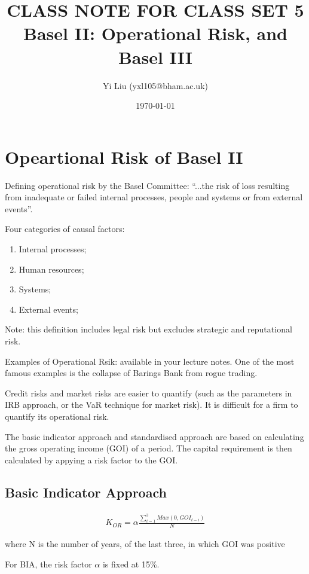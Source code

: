\documentclass[12pt]{article}
\author{Yi Liu (yxl105@bham.ac.uk)}
\date{\today}
\title{CLASS NOTE FOR CLASS SET 5 \\
  Basel II: Operational Risk, and Basel III}
\begin{document}
\maketitle
\tableofcontents

\section{Opeartional Risk of Basel II}

Defining operational risk by the Basel Committee: ``...the risk of loss resulting from inadequate or failed internal processes, people and systems or from external events''.

Four categories of causal factors:

\begin{enumerate}
    \item Internal processes;
    \item Human resources;
    \item Systems;
    \item External events;
\end{enumerate}

Note: this definition includes legal risk but excludes strategic and reputational risk.

Examples of Operational Rsik: available in your lecture notes. One of the most famous examples is the collapse of Barings Bank from rogue trading.

Credit risks and market risks are easier to quantify (such as the parameters in IRB approach, or the VaR technique for market risk). It is difficult for a firm to quantify its operational risk.

The basic indicator approach and standardised approach are based on calculating the gross operating income (GOI) of a period. The capital requirement is then calculated by appying a risk factor to the GOI.


\subsection{Basic Indicator Approach}

\begin{align*}
    K_{OR} = \alpha \frac{ \sum_{i=1}^{3} Max(0, GOI_{t-i}) }{ N }
\end{align*}

{\footnotesize where N is the number of years, of the last three, in which GOI was positive}

For BIA, the risk factor $ \alpha $ is fixed at 15\%.
\end{document}
